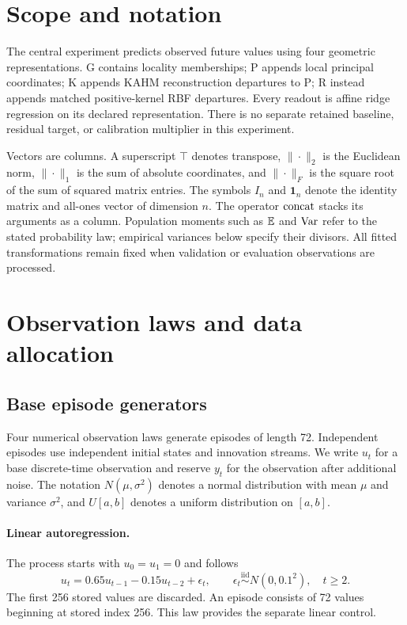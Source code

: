 
\section{Scope and notation}
The central experiment predicts observed future values using four geometric representations. G contains locality memberships; P appends local principal coordinates; K appends KAHM reconstruction departures to P; R instead appends matched positive-kernel RBF departures. Every readout is affine ridge regression on its declared representation. There is no separate retained baseline, residual target, or calibration multiplier in this experiment.

Vectors are columns. A superscript $\top$ denotes transpose, $\|\cdot\|_2$ is the Euclidean norm, $\|\cdot\|_1$ is the sum of absolute coordinates, and $\|\cdot\|_F$ is the square root of the sum of squared matrix entries. The symbols $I_n$ and $\mathbf1_n$ denote the identity matrix and all-ones vector of dimension $n$. The operator $\operatorname{concat}$ stacks its arguments as a column. Population moments such as $\mathbb E$ and $\operatorname{Var}$ refer to the stated probability law; empirical variances below specify their divisors. All fitted transformations remain fixed when validation or evaluation observations are processed.

\section{Observation laws and data allocation}\label{supp:laws}
\subsection{Base episode generators}
Four numerical observation laws generate episodes of length 72. Independent episodes use independent initial states and innovation streams. We write $u_t$ for a base discrete-time observation and reserve $y_t$ for the observation after additional noise. The notation $N(\mu,\sigma^2)$ denotes a normal distribution with mean $\mu$ and variance $\sigma^2$, and $U[a,b]$ denotes a uniform distribution on $[a,b]$.

\paragraph{Linear autoregression.}
The process starts with $u_0=u_1=0$ and follows
\[
 u_t=0.65u_{t-1}-0.15u_{t-2}+\epsilon_t,\qquad
 \epsilon_t\stackrel{\mathrm{iid}}\sim N(0,0.1^2),\quad t\geq2.
\]
The first 256 stored values are discarded. An episode consists of 72 values beginning at stored index 256. This law provides the separate linear control.

